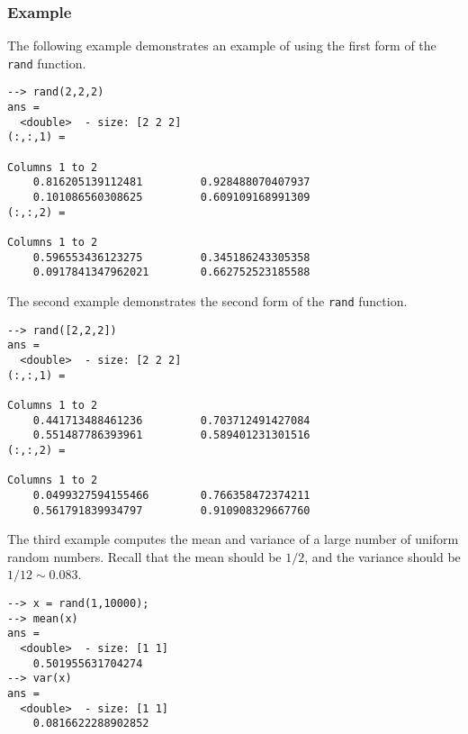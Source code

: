 \subsubsection{Example}
The following example demonstrates an example of using the first form of the \verb|rand| function.
\begin{verbatim}
--> rand(2,2,2)
ans =
  <double>  - size: [2 2 2]
(:,:,1) =
  
Columns 1 to 2
    0.816205139112481         0.928488070407937
    0.101086560308625         0.609109168991309
(:,:,2) =
  
Columns 1 to 2
    0.596553436123275         0.345186243305358
    0.0917841347962021        0.662752523185588
\end{verbatim}
The second example demonstrates the second form of the \verb|rand| function.
\begin{verbatim}
--> rand([2,2,2])
ans =
  <double>  - size: [2 2 2]
(:,:,1) =
  
Columns 1 to 2
    0.441713488461236         0.703712491427084
    0.551487786393961         0.589401231301516
(:,:,2) =
  
Columns 1 to 2
    0.0499327594155466        0.766358472374211
    0.561791839934797         0.910908329667760
\end{verbatim}
The third example computes the mean and variance of a large number of uniform random numbers.  Recall that the mean should be $1/2$, and the variance should be $1/12 \sim 0.083$.
\begin{verbatim}
--> x = rand(1,10000);
--> mean(x)
ans =
  <double>  - size: [1 1]
    0.501955631704274
--> var(x)
ans =
  <double>  - size: [1 1]
    0.0816622288902852
\end{verbatim}

